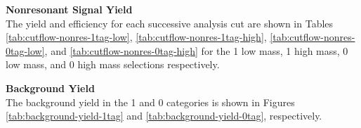 

\noindent \textbf{Nonresonant Signal Yield}\\
\indent The yield and efficiency for each successive analysis cut are shown in Tables \ref{tab:cutflow-nonres-1tag-low}, \ref{tab:cutflow-nonres-1tag-high}, \ref{tab:cutflow-nonres-0tag-low}, and \ref{tab:cutflow-nonres-0tag-high} for the 1 \btag low mass, 1 \btag high mass, 0 \btag low mass, and 0 \btag high mass selections respectively.







\noindent \textbf{Background Yield}\\
\indent The background yield in the 1 and 0 \btag categories is shown in Figures \ref{tab:background-yield-1tag} and \ref{tab:background-yield-0tag}, respectively.


